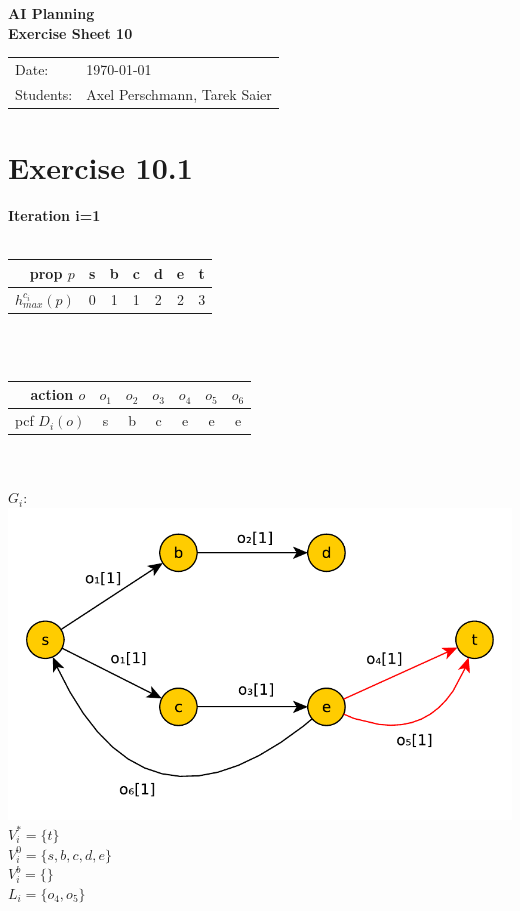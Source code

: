 \documentclass[11pt,a4paper]{article}
\newcommand{\sheetNr}{10}
\begin{document}
\begin{center}
\Huge{\textbf{AI Planning}}\\
\LARGE{\textbf{Exercise Sheet \sheetNr}}
\end{center}
\vspace{2cm}
\begin{tabular}{ll}
Date: & \today\\
Students: & Axel Perschmann, Tarek Saier
\end{tabular}

\section*{Exercise 10.1}
\textbf{Iteration i=1}\\
\\
\begin{tabular}{r|cccccc}
prop $p$ & s & b & c & d & e & t\\
\hline
$h^{c_i}_{max}(p)$ & 0 & 1 & 1 & 2 & 2 & 3
\end{tabular}\\
\\
\begin{tabular}{r|cccccc}
action $o$ & $o_1$ & $o_2$ & $o_3$ & $o_4$ & $o_5$ & $o_6$\\
\hline
pcf $D_i(o)$ & s & b & c & e & e & e
\end{tabular}\\
\\
$G_i:$\\
\includegraphics[scale=0.5]{jugraph1}\\
$V^*_i=\{t\}$\\
$V^0_i=\{s,b,c,d,e\}$\\
$V^b_i=\{\}$\\
$L_i=\{o_4,o_5\}$\\
\end{document}
